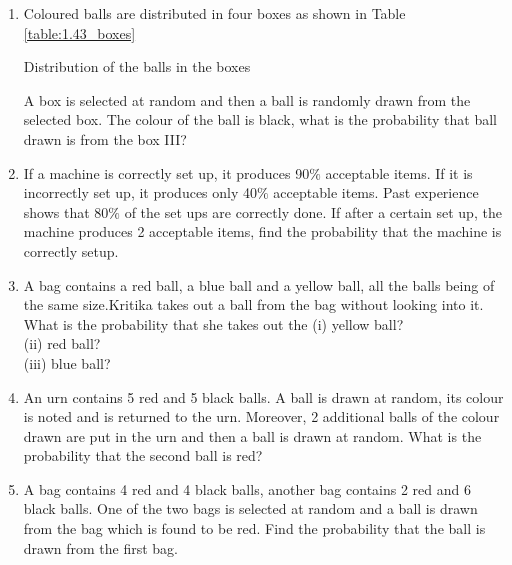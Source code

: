 \begin{enumerate}[label=\thesection.\arabic*.,ref=\thesection.\theenumi]
\item Coloured balls are distributed in four boxes as shown in Table \ref{table:1.43_boxes}

\begin{table}[ht!]
\centering

\caption{Distribution of the balls in the boxes}
\label{table:1.43_boxes}
\end{table}
A box is selected at random and then a ball is randomly drawn from the selected box. The colour of the ball is black, what is the probability that ball drawn is from the box III?
\\
\solution


\item If a machine is correctly set up, it produces 90$\%$ acceptable items. If it is
incorrectly set up, it produces only 40$\%$ acceptable items. Past experience shows that
80$\%$ of the set ups are correctly done. If after a certain set up, the machine produces 2 acceptable items, find the probability that the machine is correctly setup.
\\
\solution


\item A bag contains a red ball, a blue ball and a yellow ball, all the balls being
of the same size.Kritika takes out a ball from the bag without looking into it. What is the probability that she takes out the
(i) yellow ball? \\
(ii) red ball?\\
(iii) blue ball?
\\
\solution

\item An urn contains 5 red and 5 black balls. A ball is drawn at random, its colour is noted and is returned to the urn. Moreover, 2 additional balls of the colour drawn are put in the urn and then a ball is drawn at random. What is the probability that the second ball is red?\\
\solution


\item A bag contains 4 red and 4 black balls, another bag contains 2 red and 6 black balls. One of the two bags is selected at random and a ball is drawn from the bag which is found to be red. Find the probability that the ball is drawn from the first bag.\\
\solution



\end{enumerate}
